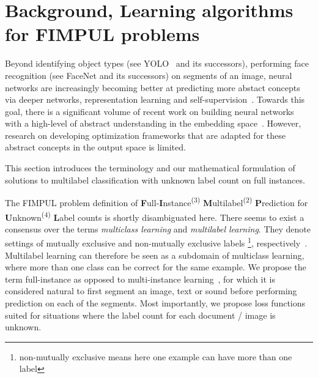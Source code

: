 
\section{Background, Learning algorithms for FIMPUL problems}
\label{section:background}

 Beyond identifying object types (see YOLO~\cite{YOLO} and its successors), performing face recognition (see FaceNet\cite{FaceNet} and its successors) on segments of an image, neural networks
are increasingly becoming better at predicting more abstact concepts via
deeper networks, representation learning and self-supervision~\citep[see,
e.g.,][]{SS,Rep}. Towards this goal, there is a significant volume of recent
work on building neural networks with a high-level of abstract understanding
in the embedding space~. However, research on developing optimization
frameworks that are adapted for these abstract concepts in the output space is
limited.

This section introduces the terminology and our mathematical formulation of solutions to multilabel classification with unknown label count on full instances.


The FIMPUL problem definition of \textbf{F}ull-\textbf{I}nstance\textsuperscript{(3)} \textbf{M}ultilabel\textsuperscript{(2)} \textbf{P}rediction for \textbf{U}nknown\textsuperscript{(4)} \textbf{L}abel counts is shortly disambiguated here. There seems to exist a consensus over the terms \emph{multiclass learning} and
\emph{multilabel learning}. They denote settings of mutually exclusive and non-mutually exclusive labels \footnote{non-mutually exclusive means here one example can have more than one label}, respectively~\cite{multilabelMethods}. Multilabel learning can
therefore be seen as a subdomain of multiclass learning, where more than one
class can be correct for the same example. We propose the term full-instance
as opposed to multi-instance learning~\citep[e.g.,][]{multiInstance,
multiInstanceMultiLabel}, for which it is considered natural to first segment
an image, text or sound before performing prediction on each of the segments. Most importantly, we propose loss functions suited for situations where the label count for each document / image is unknown.

